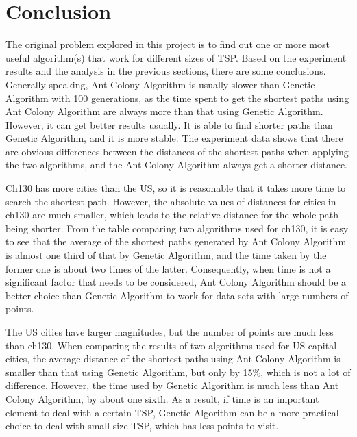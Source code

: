 \documentclass{article}
\begin{document}
\section{Conclusion}
The original problem explored in this project is to find out one or more most useful algorithm(s) that work for different sizes of TSP. Based on the experiment results and the analysis in the previous sections, there are some conclusions.
Generally speaking, Ant Colony Algorithm is usually slower than Genetic Algorithm with 100 generations, as the time spent to get the shortest paths using Ant Colony Algorithm are always more than that using Genetic Algorithm. However, it can get better results usually. It is able to find shorter paths than Genetic Algorithm, and it is more stable. The experiment data shows that there are obvious differences between the distances of the shortest paths when applying the two algorithms, and the Ant Colony Algorithm always get a shorter distance. 

Ch130 has more cities than the US, so it is reasonable that it takes more time to search the shortest path. However, the absolute values of distances for cities in ch130 are much smaller, which leads to the relative distance for the whole path being shorter. From the table comparing two algorithms used for ch130, it is easy to see that the average of the shortest paths generated by Ant Colony Algorithm is almost one third of that by Genetic Algorithm, and the time taken by the former one is about two times of the latter. Consequently, when time is not a significant factor that needs to be considered, Ant Colony Algorithm should be a better choice than Genetic Algorithm to work for data sets with large numbers of points. 

The US cities have larger magnitudes, but the number of points are much less than ch130. When comparing the results of two algorithms used for US capital cities, the average distance of the shortest paths using Ant Colony Algorithm is smaller than that using Genetic Algorithm, but only by 15\%, which is not a lot of difference. However, the time used by Genetic Algorithm is much less than Ant Colony Algorithm, by about one sixth. As a result, if time is an important element to deal with a certain TSP, Genetic Algorithm can be a more practical choice to deal with small-size TSP, which has less points to visit.

\pagebreak




\end{document}
